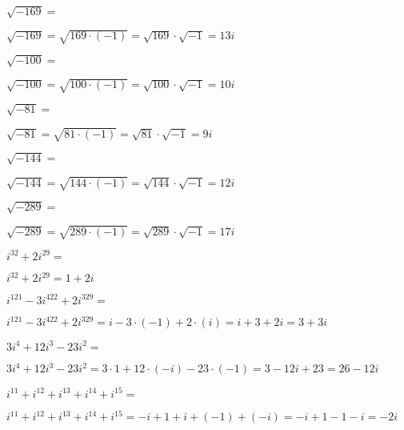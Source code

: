 \documentclass[12pt,addpoints,x11names]{exam}
\begin{document}
\begin{questions}
 \question[2] $\sqrt{-169}=$
   \begin{solutionbox}{.5in}
    $\sqrt{-169}=\sqrt{169\cdot(-1)}=\sqrt{169}\cdot\sqrt{-1}=13i$
  \end{solutionbox}
\question[2] $\sqrt{-100}=$
   \begin{solutionbox}{.5in}
    $\sqrt{-100}=\sqrt{100\cdot(-1)}=\sqrt{100}\cdot\sqrt{-1}=10i$
  \end{solutionbox}
\question[2] $\sqrt{-81}=$
   \begin{solutionbox}{1in}
    $\sqrt{-81}=\sqrt{81\cdot(-1)}=\sqrt{81}\cdot\sqrt{-1}=9i$
  \end{solutionbox}
\question[2] $\sqrt{-144}=$
   \begin{solutionbox}{1in}
    $\sqrt{-144}=\sqrt{144\cdot(-1)}=\sqrt{144}\cdot\sqrt{-1}=12i$
  \end{solutionbox}
\question[2] $\sqrt{-289}=$
  \begin{solutionbox}{1in}
    $\sqrt{-289}=\sqrt{289\cdot(-1)}=\sqrt{289}\cdot\sqrt{-1}=17i$
  \end{solutionbox}

  \pagebreak
\question[3] $i^{32}+2i^{29}=$
  \begin{solutionbox}{1.5in}
    $i^{32}+2i^{29}=1+2i$
  \end{solutionbox}
 \question[3] $i^{121}-3i^{422}+2i^{329}=$
   \begin{solutionbox}{1.5in}
    $i^{121}-3i^{422}+2i^{329}=i-3\cdot(-1)+2\cdot(i)=i+3+2i=3+3i$
  \end{solutionbox}
\question[3] $3i^{4}+12i^{3}-23i^{2}=$
   \begin{solutionbox}{1.5in}
     $3i^{4}+12i^{3}-23i^{2}=3\cdot1+12\cdot(-i)-23\cdot(-1)=3-12i+23=26-12i$
  \end{solutionbox}
\question[3] $i^{11}+i^{12}+i^{13}+i^{14}+i^{15}=$
  \begin{solutionbox}{1.5in}
     $i^{11}+i^{12}+i^{13}+i^{14}+i^{15}=-i+1+i+(-1)+(-i)=-i+1-1-i=-2i$
  \end{solutionbox}
  \pagebreak


\end{questions}
\end{document}
